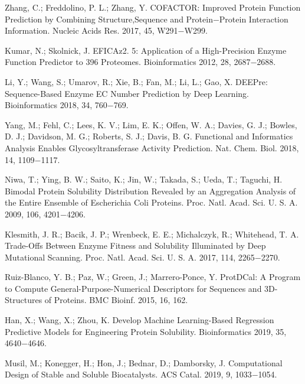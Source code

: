 \documentclass[12pt]{article}
\begin{document}
\begin{thebibliography}{20}
 Zhang, C.; Freddolino, P. L.; Zhang, Y. COFACTOR: Improved Protein Function Prediction by Combining Structure,Sequence and Protein−Protein Interaction Information. Nucleic Acids Res. 2017, 45, W291−W299.

 Kumar, N.; Skolnick, J. EFICAz2. 5: Application of a High-Precision Enzyme Function Predictor to 396 Proteomes. Bioinformatics 2012, 28, 2687−2688.

 Li, Y.; Wang, S.; Umarov, R.; Xie, B.; Fan, M.; Li, L.; Gao, X. DEEPre: Sequence-Based Enzyme EC Number Prediction by Deep Learning. Bioinformatics 2018, 34, 760−769.

 Yang, M.; Fehl, C.; Lees, K. V.; Lim, E. K.; Offen, W. A.; Davies, G. J.; Bowles, D. J.; Davidson, M. G.; Roberts, S. J.; Davis, B. G. Functional and Informatics Analysis Enables Glycosyltransferase Activity Prediction. Nat. Chem. Biol. 2018, 14, 1109−1117.

 Niwa, T.; Ying, B. W.; Saito, K.; Jin, W.; Takada, S.; Ueda, T.; Taguchi, H. Bimodal Protein Solubility Distribution Revealed by an Aggregation Analysis of the Entire Ensemble of Escherichia Coli Proteins. Proc. Natl. Acad. Sci. U. S. A. 2009, 106, 4201−4206.

 Klesmith, J. R.; Bacik, J. P.; Wrenbeck, E. E.; Michalczyk, R.; Whitehead, T. A. Trade-Offs Between Enzyme Fitness and Solubility Illuminated by Deep Mutational Scanning. Proc. Natl. Acad. Sci. U. S. A. 2017, 114, 2265−2270.

 Ruiz-Blanco, Y. B.; Paz, W.; Green, J.; Marrero-Ponce, Y. ProtDCal: A Program to Compute General-Purpose-Numerical
Descriptors for Sequences and 3D-Structures of Proteins. BMC Bioinf. 2015, 16, 162.

 Han, X.; Wang, X.; Zhou, K. Develop Machine Learning-Based Regression Predictive Models for Engineering Protein Solubility. Bioinformatics 2019, 35, 4640−4646.

 Musil, M.; Konegger, H.; Hon, J.; Bednar, D.; Damborsky, J. Computational Design of Stable and Soluble Biocatalysts. ACS Catal. 2019, 9, 1033−1054.
\end{thebibliography}
\end{document}

